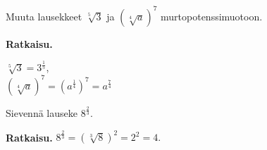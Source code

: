 \begin{esimerkki}
Muuta lausekkeet $\sqrt[5]{3}$ ja $(\sqrt[4]{a})^7$ murtopotenssimuotoon.

{\bf Ratkaisu.}

$\sqrt[5]{3} = 3^\frac{1}{5}$, \\
$(\sqrt[4]{a})^7 = (a^\frac{1}{4})^7=a^\frac{7}{4}$
\end{esimerkki}

\begin{esimerkki}
Sievennä lauseke $8^\frac{2}{3}$.

{\bf Ratkaisu.}
 $8^\frac{2}{3} = (\sqrt[3]{8})^2 = 2^2 = 4.$
\end{esimerkki}
